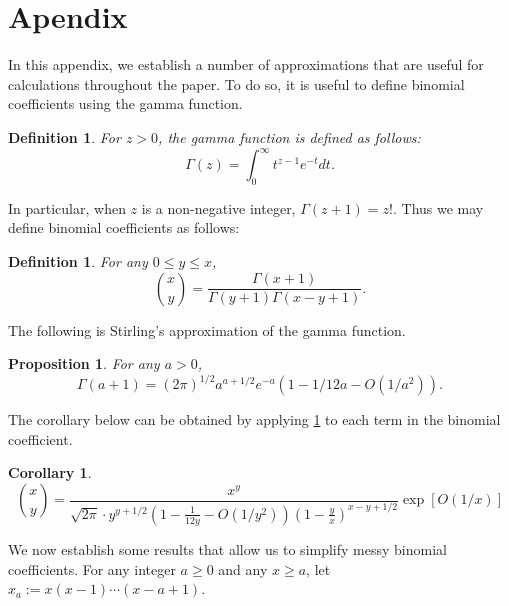 \documentclass[11pt]{article}
\theoremstyle{plain}
\newtheorem{prop}[thm]{Proposition}
\newtheorem{cor}[thm]{Corollary}
\newtheorem{definition}[thm]{Definition}
\begin{document}





\newpage



\appendix
\section{Apendix}\label{sec: Appendix}
In this appendix, we establish a number of approximations that are useful for calculations throughout the paper. To do so, it is useful to define binomial coefficients using the gamma function. 

\begin{definition}
    For $z > 0$, the gamma function is defined as follows:
    \[
    \Gamma(z) = \int_{0}^\infty t^{z-1}e^{-t}dt.
    \]
\end{definition}
In particular, when $z$ is a non-negative integer, $\Gamma(z + 1) = z!$. Thus we may define binomial coefficients as follows:
\begin{definition}
    For any $0 \leq y \leq x$, 
    \[
    \binom{x}{y} = \frac{\Gamma(x+1)}{\Gamma(y+1)\Gamma(x - y + 1)}.
    \]
\end{definition}

The following is Stirling's approximation of the gamma function. 
\begin{prop}\label{prop: stirling} \cite{Stirling1730} For any $a > 0$,
    \[
    \Gamma(a+1) = (2\pi)^{1/2}a^{a + 1/2}e^{-a}(1 - 1/12a - O(1/a^2)).
    \]
\end{prop}
The corollary below can be obtained by applying \cref{prop: stirling} to each term in the binomial coefficient.
\begin{cor}\label{cor: choose}
    \[
    \binom{x}{y} = \frac{x^{y}}{\sqrt{2\pi}\cdot y^{y + 1/2}\left(1 - \frac{1}{12y} - O(1/y^2)\right)\left(1 - \frac{y}{x}\right)^{x - y + 1/2}}\exp[O(1/x)]
    \]
\end{cor}

We now establish some results that allow us to simplify messy binomial coefficients.
For any integer $a \geq 0$ and any $x \geq a$, let $x_a := x(x-1)\cdots(x-a+1)$. 
\end{document}
